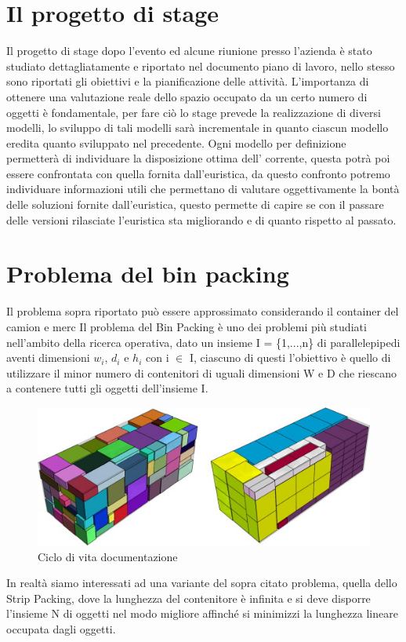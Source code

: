 \section{Il progetto di stage}
Il progetto di stage dopo l'evento  ed alcune riunione presso l'azienda è stato studiato dettagliatamente e riportato nel documento piano di lavoro, nello stesso sono riportati gli obiettivi e la pianificazione delle attività.
L'importanza di ottenere una valutazione reale dello spazio occupato da un certo numero di oggetti è fondamentale, per fare ciò lo stage prevede la realizzazione di diversi modelli, lo sviluppo di tali modelli sarà incrementale in quanto ciascun modello eredita quanto sviluppato nel precedente. Ogni modello per definizione permetterà di individuare la disposizione ottima dell' corrente, questa potrà poi essere confrontata con quella fornita dall'euristica, da questo confronto potremo individuare informazioni utili che permettano di valutare oggettivamente la bontà delle soluzioni fornite dall'euristica, questo permette di capire se con il passare delle versioni rilasciate l'euristica sta migliorando e di quanto rispetto al passato.

\section{Problema del bin packing}
Il problema sopra riportato può essere approssimato considerando il container del camion e merc
Il problema del Bin Packing è uno dei problemi più studiati nell'ambito della ricerca operativa, dato un insieme I = \{1,...,n\} di parallelepipedi aventi dimensioni $w_{i}$, $d_{i}$ e $h_{i}$ con i $\in$ I, ciascuno di questi  l'obiettivo è quello di utilizzare il minor numero di contenitori di uguali dimensioni W e D che riescano a contenere tutti gli oggetti dell'insieme I.\\
\begin{figure}[!h]
    \begin{center} \includegraphics[scale=1]{figures/bin_packing}
        \caption[ciucia]{Ciclo di vita documentazione}
        \label{fig:myInlineFigure}
    \end{center}
\end{figure}
\newline
In realtà siamo interessati ad una variante del sopra citato problema, quella dello Strip Packing, dove la lunghezza del contenitore è infinita e si deve disporre l'insieme N di oggetti nel modo migliore affinché si minimizzi la lunghezza lineare occupata dagli oggetti.

